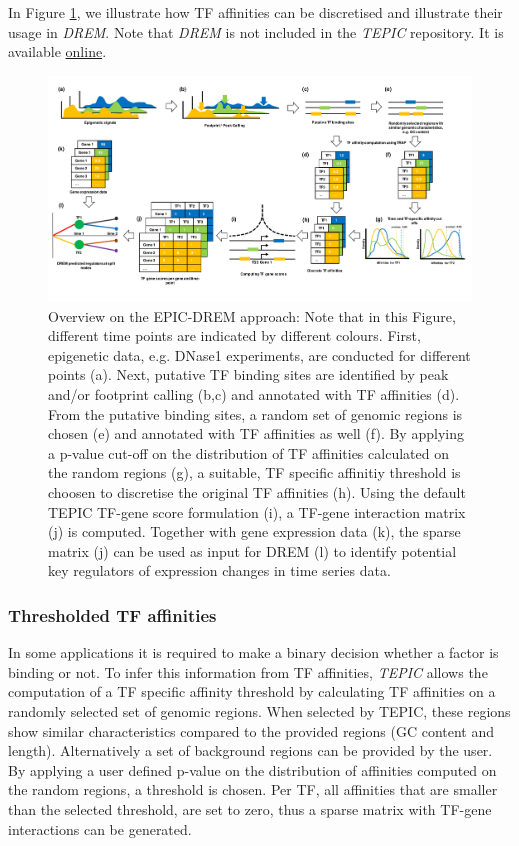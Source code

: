 \documentclass{article}
\begin{document}
In Figure \ref{epicdrem}, we illustrate how TF affinities can be discretised and illustrate their usage in \textit{DREM}. Note that \textit{DREM}
is not included in the \textit{TEPIC} repository. It is available \href{http://www.sb.cs.cmu.edu/drem/}{online}.
\begin{figure}[h!]
\begin{center}
\includegraphics[width=\textwidth]{epicdrem.pdf}
\end{center}
\caption{Overview on the EPIC-DREM approach: Note that in this Figure, different time points are indicated by different colours. First, epigenetic data, e.g. DNase1 experiments, are conducted for different points (a).
Next, putative TF binding sites are identified by peak and/or footprint calling (b,c) and annotated with TF affinities (d). 
From the putative binding sites, a random set of genomic regions is chosen (e) and annotated with TF affinities as well (f). By applying a p-value cut-off on the distribution of TF affinities calculated on the random regions (g),
a suitable, TF specific affinitiy threshold is choosen to discretise the original TF affinities (h). Using the default TEPIC TF-gene score formulation (i), a TF-gene interaction matrix (j) is computed. Together with gene expression data (k),
the sparse matrix (j) can be used as input for DREM (l) to identify potential key regulators of expression changes in time series data.}
\label{epicdrem}
\end{figure}

\subsubsection*{Thresholded TF affinities}
In some applications it is required to make a binary decision whether a factor is binding or not. 
To infer this information from TF affinities, \textit{TEPIC} allows the computation of a TF specific affinity threshold by calculating TF affinities on a randomly selected set of genomic regions. When selected by TEPIC, these regions show similar characteristics compared to the provided regions (GC content and length). 
Alternatively a set of background regions can be provided by the user.
By applying a user defined p-value on the distribution of affinities computed on the random regions, a threshold is chosen. 
Per TF, all affinities that are smaller than the selected threshold, are set to zero, thus a sparse matrix with TF-gene interactions can be generated. 
\end{document}
